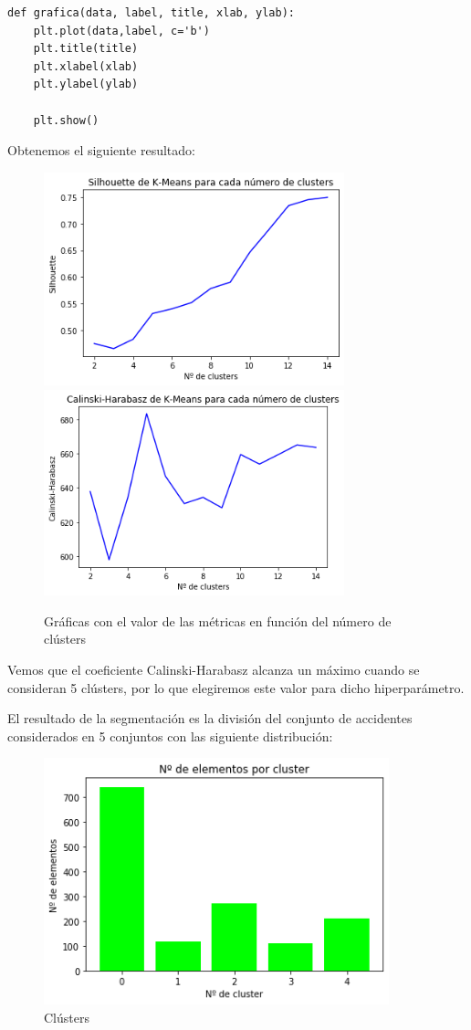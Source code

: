 \documentclass[a4]{article}
\begin{document}
\begin{lstlisting}
def grafica(data, label, title, xlab, ylab):
    plt.plot(data,label, c='b')
    plt.title(title)
    plt.xlabel(xlab)
    plt.ylabel(ylab)

    plt.show()
  \end{lstlisting}

Obtenemos el siguiente resultado:

\begin{figure}[H]
  \centering
  \caption{Gráficas con el valor de las métricas en función del número de clústers}
  \includegraphics[width=87mm]{imagenes/c1_kmeans_sil}
  \includegraphics[width=87mm]{imagenes/c1_kmeans_cal}
\end{figure}

Vemos que el coeficiente Calinski-Harabasz alcanza un máximo cuando se consideran 5 clústers, por lo que elegiremos este valor para dicho hiperparámetro.

El resultado de la segmentación es la división del conjunto de accidentes considerados en 5 conjuntos con las siguiente distribución:

\begin{figure}[H]
  \centering
  \caption{Clústers}
  \includegraphics[width=100mm]{imagenes/c1_kmeans_clusters}
\end{figure}
\end{document}
